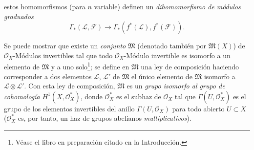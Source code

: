 \begin{env}[5.4.6]

estos homomorfismos (para $n$ variable) definen un
\emph{dihomomorfismo de módulos graduados}
\[
  \Gamma_*(\mathcal{L},\mathcal{F})
  \longrightarrow
  \Gamma_*(f^*(\mathcal{L}),f^*(\mathcal{F})).
\]
\end{env}

\begin{env}[5.4.7]
Se puede mostrar que existe un \emph{conjunto} $\mathfrak{M}$ (denotado también
por $\mathfrak{M}(X)$) de $\mathcal{O}_X$-Módulos invertibles tal que todo
$\mathcal{O}_X$-Módulo invertible es isomorfo a un elemento de
$\mathfrak{M}$ y a uno solo\footnote{Véase el libro en preparación citado en
la Introducción.}; se define en $\mathfrak{M}$ una ley de composición
haciendo corresponder a dos elementos $\mathcal{L}$, $\mathcal{L}'$ de
$\mathfrak{M}$ el único elemento de $\mathfrak{M}$ isomorfo a
$\mathcal{L}\otimes\mathcal{L}'$. Con esta ley de
composición, $\mathfrak{M}$ es un \emph{grupo isomorfo al grupo de
cohomología} $H^1(X,\mathcal{O}_X^*)$, donde $\mathcal{O}_X^*$ es el
subhaz de $\mathcal{O}_X$ tal que $\Gamma(U,\mathcal{O}_X^*)$ es el
grupo de los elementos invertibles del anillo $\Gamma(U,\mathcal{O}_X)$ para
todo abierto $U\subset X$ ($\mathcal{O}_X^*$ es, por tanto, un haz de grupos
abelianos \emph{multiplicativos}).


\end{env}
